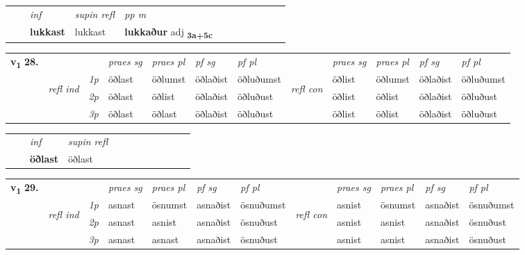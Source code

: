 \begin{tabular}{llllllllllll}
 & & \textit{inf}       & \textit{supin refl} & \textit{pp m}     \\*
  & & \textbf{lukkast}        & lukkast & \textbf{lukkaður} adj \textbf{\textsubscript{3a+5c}} \\*
\cmidrule{1-12}
\end{tabular}



\begin{tabular}{llllllllllll} \toprule
\multirow{4}{*}{{{\textbf{v{\textsubscript{1}}} \Large{\textbf{28.}}}}}  & &   &  \textit{praes sg}  & \textit{praes pl}  &\textit{pf sg} & \textit{pf pl} &  &  \textit{praes sg}  & \textit{praes pl}  & \textit{pf sg} & \textit{pf pl } \\*
	\cmidrule{4-7} \cmidrule{9-12}
 &\multirow{3}{*}{\begin{turn}{90}\textit{refl ind}\end{turn}} & {\textit{1p}} & öðlast & öðlumst    & öðlaðist & öðluðumst & \multirow{3}{*}{\begin{turn}{90}\textit{refl con}\end{turn}}  &öðlist & öðlumst & öðlaðist & öðluðumst\\*
 &&  {\textit{2p}} &  öðlast  & öðlist   & öðlaðist & öðluðust & &öðlist & öðlist & öðlaðist & öðluðust \\*
& &  {\textit{3p}} & öðlast & öðlast   & öðlaðist & öðluðust & & öðlist & öðlist& öðlaðist & öðluðust  \\*
\cmidrule{4-7} \cmidrule{9-12}
\end{tabular}


\begin{tabular}{llllllllllll}
 & & \textit{inf}       & \textit{supin refl}      \\*
  & & \textbf{öðlast}        & öðlast  \\*
\cmidrule{1-12}
\end{tabular}



\begin{tabular}{llllllllllll} \toprule
\multirow{4}{*}{{{\textbf{v{\textsubscript{1}}} \Large{\textbf{29.}}}}}  & &   &  \textit{praes sg}  & \textit{praes pl}  &\textit{pf sg} & \textit{pf pl} &  &  \textit{praes sg}  & \textit{praes pl}  & \textit{pf sg} & \textit{pf pl } \\*
	\cmidrule{4-7} \cmidrule{9-12}
 &\multirow{3}{*}{\begin{turn}{90}\textit{refl ind}\end{turn}} & {\textit{1p}} & asnast & ösnumst    & asnaðist & ösnuðumst & \multirow{3}{*}{\begin{turn}{90}\textit{refl con}\end{turn}}  &asnist & ösnumst & asnaðist & ösnuðumst\\*
 &&  {\textit{2p}} &  asnast  & asnist   & asnaðist & ösnuðust & &asnist & asnist & asnaðist & ösnuðust \\*
& &  {\textit{3p}} & asnast & asnast   & asnaðist & ösnuðust & & asnist & asnist& asnaðist & ösnuðust  \\*
\cmidrule{4-7} \cmidrule{9-12}
\end{tabular}


